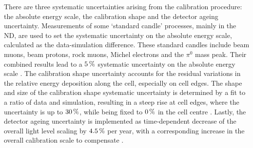 
There are three systematic uncertainties arising from the calibration procedure: the absolute energy scale, the calibration shape and the detector ageing uncertainty. Measurements of some `standard candle' processes, mainly in the \gls{ND}, are used to set the systematic uncertainty on the absolute energy scale, calculated as the data-simulation difference. These standard candles include beam muons, beam protons, rock muons, Michel electrons and the $\pi^0$ mass peak. Their combined results lead to a $\unit[5]{\%}$ systematic uncertainty on the absolute energy scale \cite{NOVA-doc-53225}. The calibration shape uncertainty accounts for the residual variations in the relative energy deposition along the cell, especially on cell edges. The shape and size of the calibration shape systematic uncertainty is determined by a fit to a ratio of data and simulation, resulting in a steep rise at cell edges, where the uncertainty is up to $\unit[30]{\%}$, while being fixed to $\unit[0]{\%}$ in the cell centre \cite{NOvA-doc-49986}. Lastly, the detector ageing uncertainty is implemented as time-dependent decrease of the overall light level scaling by $\unit[4.5]{\%}$ per year, with a corresponding increase in the overall calibration scale to compensate \cite{NOVA-doc-43935}.






